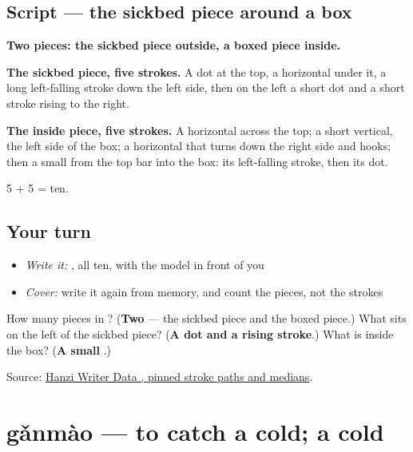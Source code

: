 \subsection*{Script — the sickbed piece around a box}

\begin{quote}
\end{quote}

\textbf{Two pieces: the sickbed piece outside, a boxed piece inside.}

\textbf{The sickbed piece, five strokes.} A dot at the top, a horizontal under it, a long left-falling stroke down the left side, then on the left a short dot and a short stroke rising to the right.

\textbf{The inside piece, five strokes.} A horizontal across the top; a short vertical, the left side of the box; a horizontal that turns down the right side and hooks; then a small  from the top bar into the box: its left-falling stroke, then its dot.

5 + 5 = ten.

\subsection*{Your turn}
\begin{itemize}
\raggedright
  \item \emph{Write it:} , all ten, with the model in front of you
  \item \emph{Cover:} write it again from memory, and count the pieces, not the strokes
\end{itemize}

\begin{tcolorbox}[breakable,colback=teal!4,colframe=teal!35!black,title={Before you move on}]
How many pieces in ? (\textbf{Two} — the sickbed piece and the boxed piece.) What sits on the left of the sickbed piece? (\textbf{A dot and a rising stroke}.) What is inside the box? (\textbf{A small }.)

Source: \href{https://raw.githubusercontent.com/chanind/hanzi-writer-data/68d10a4b21150cae5e1ebbd223eed289cf32d90c/data/\%E7\%97\%85.json}{Hanzi Writer Data , pinned stroke paths and medians}.
\end{tcolorbox}
\section[gǎnmào]{gǎnmào — to catch a cold; a cold}

